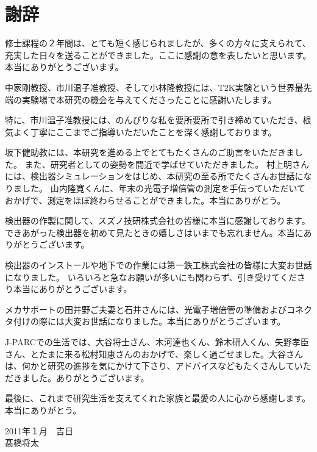 \documentclass[11pt]{ltjsreport}
\begin{document}
\chapter*{謝辞}

修士課程の２年間は、とても短く感じられましたが、多くの方々に支えられて、充実した日々を送ることができました。ここに感謝の意を表したいと思います。本当にありがとうございます。

中家剛教授、市川温子准教授、そして小林隆教授には、T2K実験という世界最先端の実験場で本研究の機会を与えてくださったことに感謝いたします。

特に、市川温子准教授には、のんびりな私を要所要所で引き締めていただき、根気よく丁寧にここまでご指導いただいたことを深く感謝しております。

坂下健助教には、本研究を進める上でとてもたくさんのご助言をいただきました。
また、研究者としての姿勢を間近で学ばせていただきました。
村上明さんには、検出器シミュレーションをはじめ、本研究の至る所でたくさんお世話になりました。
山内隆寛くんに、年末の光電子増倍管の測定を手伝っていただいておかげで、測定をほぼ終わらせることができました。本当にありがとう。

検出器の作製に関して、スズノ技研株式会社の皆様に本当に感謝しております。できあがった検出器を初めて見たときの嬉しさはいまでも忘れません。本当にありがとうございます。

検出器のインストールや地下での作業には第一鉄工株式会社の皆様に大変お世話になりました。
いろいろと急なお願いが多いにも関わらず、引き受けてくださり本当にありがとうございます。

メカサポートの田井野ご夫妻と石井さんには、光電子増倍管の準備およびコネクタ付けの際には大変お世話になりました。本当にありがとうございます。


J-PARCでの生活では、大谷将士さん、木河達也くん、鈴木研人くん、矢野孝臣さん、とたまに来る松村知恵さんのおかげで、楽しく過ごせました。大谷さんは、何かと研究の進捗を気にかけて下さり、アドバイスなどもたくさんしていただきました。ありがとうございます。\newline

最後に、これまで研究生活を支えてくれた家族と最愛の人に心から感謝します。本当にありがとう。\newline
\begin{flushright}
2011年１月　吉日\\
髙橋将太
\end{flushright}



%
%
\end{document}
